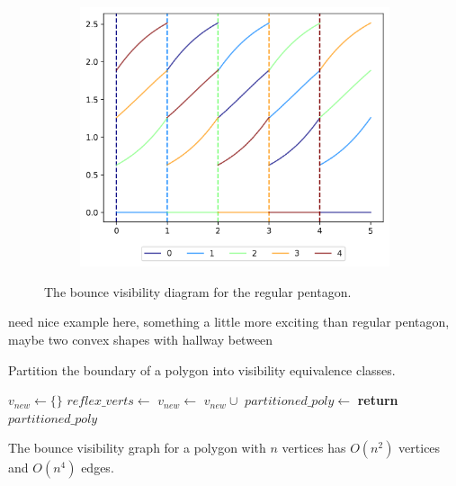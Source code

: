 \documentclass[]{styles/svproc}  %
\begin{document}
\begin{figure}
\begin{subfigure}{0.35\textwidth}
\includegraphics[width=\linewidth]{figures/regular_pent_bvd.png}
\end{subfigure}
\caption{The bounce visibility diagram for the regular pentagon. }
\label{fig:regular_pent_bvd}
\end{figure}

{\color{red} need nice example here, something a little more exciting than
regular pentagon, maybe two convex shapes with hallway between}


\begin{algorithm}
\caption{Partition the boundary of a polygon into visibility
equivalence classes.}
\label{algo:insert}
\begin{algorithmic}
\State $v_{new} \gets \{\}$
\State $reflex\_verts \gets$ 
        \State $v_{new} \gets$ $v_{new} \cup$ 
    \EndFor
\EndFor
\State $partitioned\_poly \gets$ 
\State \textbf{return} $partitioned\_poly$
\EndProcedure
\end{algorithmic}
\end{algorithm}

\begin{proposition} The bounce visibility graph for a polygon with $n$ vertices has 
$O(n^2)$ vertices and $O(n^4)$ edges.
\end{proposition}
\end{document}
